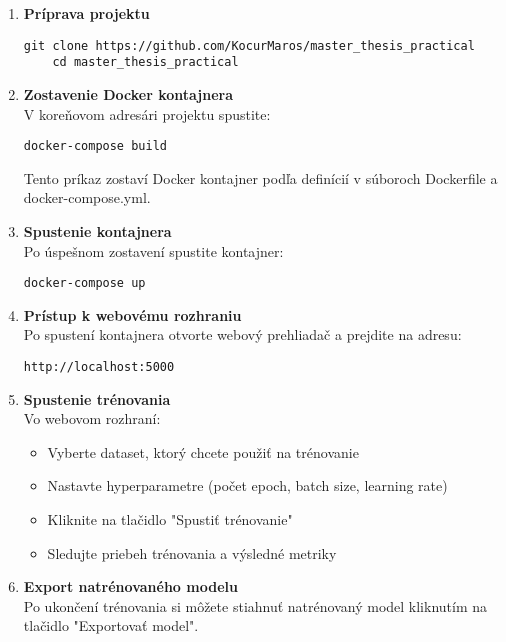 \begin{enumerate}
    \item \textbf{Príprava projektu}
    \begin{lstlisting}[basicstyle=\ttfamily\small]
    git clone https://github.com/KocurMaros/master_thesis_practical
    cd master_thesis_practical
    \end{lstlisting}
    
    \item \textbf{Zostavenie Docker kontajnera}\\
    V koreňovom adresári projektu spustite:
    \begin{lstlisting}[basicstyle=\ttfamily\small]
    docker-compose build
    \end{lstlisting}
    Tento príkaz zostaví Docker kontajner podľa definícií v súboroch Dockerfile a docker-compose.yml.
    
    \item \textbf{Spustenie kontajnera}\\
    Po úspešnom zostavení spustite kontajner:
    \begin{lstlisting}[basicstyle=\ttfamily\small]
    docker-compose up
    \end{lstlisting}
    
    \item \textbf{Prístup k webovému rozhraniu}\\
    Po spustení kontajnera otvorte webový prehliadač a prejdite na adresu:
    \begin{lstlisting}[basicstyle=\ttfamily\small]
    http://localhost:5000
    \end{lstlisting}
    
    \item \textbf{Spustenie trénovania}\\
    Vo webovom rozhraní:
    \begin{itemize}
        \item Vyberte dataset, ktorý chcete použiť na trénovanie
        \item Nastavte hyperparametre (počet epoch, batch size, learning rate)
        \item Kliknite na tlačidlo "Spustiť trénovanie"
        \item Sledujte priebeh trénovania a výsledné metriky
    \end{itemize}
    
    \item \textbf{Export natrénovaného modelu}\\
    Po ukončení trénovania si môžete stiahnuť natrénovaný model kliknutím na tlačidlo "Exportovať model".
\end{enumerate}

